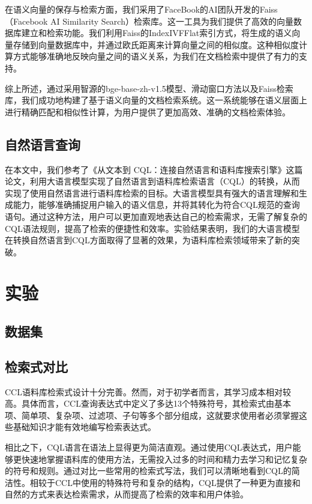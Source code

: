 \documentclass[11pt]{article}
\begin{document}
\begin{CJK*}{UTF8}{gbsn}
在语义向量的保存与检索方面，我们采用了FaceBook的AI团队开发的Faiss（Facebook AI Similarity Search）检索库。这一工具为我们提供了高效的向量数据库建立和检索功能。我们利用Faiss的IndexIVFFlat索引方式，将生成的语义向量存储到向量数据库中，并通过欧氏距离来计算向量之间的相似度。这种相似度计算方式能够准确地反映向量之间的语义关系，为我们在文档检索中提供了有力的支持。

综上所述，通过采用智源的bge-base-zh-v1.5模型、滑动窗口方法以及Faiss检索库，我们成功地构建了基于语义向量的文档检索系统。这一系统能够在语义层面上进行精确匹配和相似性计算，为用户提供了更加高效、准确的文档检索体验。

\subsection{自然语言查询}

在本文中，我们参考了《从文本到 CQL：连接自然语言和语料库搜索引擎》这篇论文，利用大语言模型实现了自然语言到语料库检索语言（CQL）的转换，从而实现了使用自然语言进行语料库检索的目标。大语言模型具有强大的语言理解和生成能力，能够准确捕捉用户输入的语义信息，并将其转化为符合CQL规范的查询语句。通过这种方法，用户可以更加直观地表达自己的检索需求，无需了解复杂的CQL语法规则，提高了检索的便捷性和效率。实验结果表明，我们的大语言模型在转换自然语言到CQL方面取得了显著的效果，为语料库检索领域带来了新的突破。

\section{实验}

\subsection{数据集}


\subsection{检索式对比}

CCL语料库检索式设计十分完善。然而，对于初学者而言，其学习成本相对较高。具体而言，CCL查询表达式中定义了多达13个特殊符号，其检索式由基本项、简单项、复杂项、过滤项、子句等多个部分组成，这就要求使用者必须掌握这些基础知识才能有效地编写检索表达式。

相比之下，CQL语言在语法上显得更为简洁直观。通过使用CQL表达式，用户能够更快速地掌握语料库的使用方法，无需投入过多的时间和精力去学习和记忆复杂的符号和规则。通过对比一些常用的检索式写法，我们可以清晰地看到CQL的简洁性。相较于CCL中使用的特殊符号和复杂的结构，CQL提供了一种更为直接和自然的方式来表达检索需求，从而提高了检索的效率和用户体验。



\end{CJK*}
\end{document}

